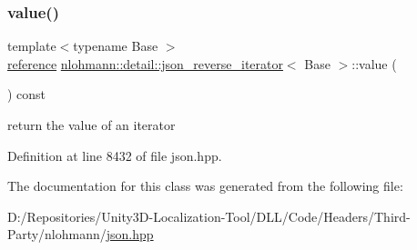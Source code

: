 \subsubsection{\texorpdfstring{value()}{value()}}
{\footnotesize\ttfamily template$<$typename Base $>$ \\
\mbox{\hyperlink{classnlohmann_1_1detail_1_1json__reverse__iterator_a42f51a69bac7b2aebb613b2164e457f1}{reference}} \mbox{\hyperlink{classnlohmann_1_1detail_1_1json__reverse__iterator}{nlohmann\+::detail\+::json\+\_\+reverse\+\_\+iterator}}$<$ Base $>$\+::value (\begin{DoxyParamCaption}{ }\end{DoxyParamCaption}) const\hspace{0.3cm}{\ttfamily [inline]}}



return the value of an iterator 



Definition at line 8432 of file json.\+hpp.



The documentation for this class was generated from the following file\+:\begin{DoxyCompactItemize}
\item 
D\+:/\+Repositories/\+Unity3\+D-\/\+Localization-\/\+Tool/\+D\+L\+L/\+Code/\+Headers/\+Third-\/\+Party/nlohmann/\mbox{\hyperlink{json_8hpp}{json.\+hpp}}\end{DoxyCompactItemize}
